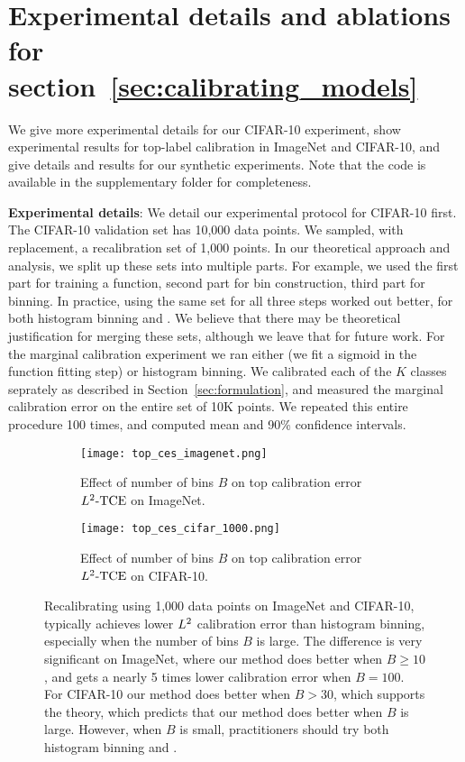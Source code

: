 \newpage
\section{Experimental details and ablations for section~\ref{sec:calibrating_models}}
\label{sec:calibrating_models_appendix_experiments}

We give more experimental details for our CIFAR-10 experiment, show experimental results for top-label calibration in ImageNet and CIFAR-10, and give details and results for our synthetic experiments. Note that the code is available in the supplementary folder for completeness.

\textbf{Experimental details}: We detail our experimental protocol for CIFAR-10 first. The CIFAR-10 validation set has 10,000 data points. We sampled, with replacement, a recalibration set of 1,000 points. In our theoretical approach and analysis, we split up these sets into multiple parts. For example, we used the first part for training a function, second part for bin construction, third part for binning. In practice, using the same set for all three steps worked out better, for both histogram binning and \ourcal{}. We believe that there may be theoretical justification for merging these sets, although we leave that for future work. For the marginal calibration experiment we ran either \ourcal{} (we fit a sigmoid in the function fitting step) or histogram binning. We calibrated each of the $K$ classes seprately as described in Section~\ref{sec:formulation}, and measured the marginal calibration error on the entire set of 10K points. We repeated this entire procedure 100 times, and computed mean and 90\% confidence intervals.

\begin{figure}
  \centering
  \centering
  	 \begin{subfigure}[b]{0.48\textwidth}
         \centering
         \texttt{[image: top\_ces\_imagenet.png]}
         \caption{Effect of number of bins $B$ on top calibration error $L^2\mbox{-TCE}$ on ImageNet.
         }
         \label{fig:imagenet_top_cal_var_red}
     \end{subfigure}
     \hfill
     \begin{subfigure}[b]{0.48\textwidth}
         \centering
         \texttt{[image: top\_ces\_cifar\_1000.png]}
         \caption{Effect of number of bins $B$ on top calibration error $L^2\mbox{-TCE}$ on CIFAR-10.
         }
         \label{fig:cifar_top_cal_var_red}
     \end{subfigure}
  \caption{
    Recalibrating using 1,000 data points on ImageNet and CIFAR-10, \ourcal{} typically achieves lower $L^2$ calibration error than histogram binning, especially when the number of bins $B$ is large. The difference is very significant on ImageNet, where our method does better when $B \geq 10$, and gets a nearly 5 times lower calibration error when $B = 100$. For CIFAR-10 our method does better when $B > 30$, which supports the theory, which predicts that our method does better when $B$ is large. However, when $B$ is small, practitioners should try both histogram binning and \ourcal{}.
}
  \label{fig:mse_estimators_bins}
\end{figure}

